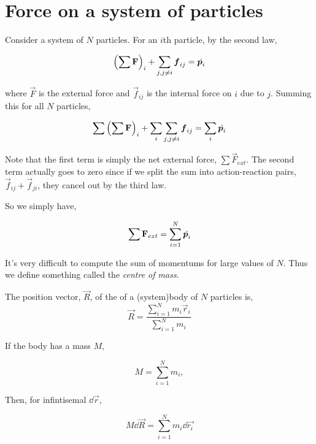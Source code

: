 \section{Force on a system of particles}

Consider a system of \(N\) particles. For an \(i\)th particle, by the second law,

\begin{equation*}
    \qty(\sum \mathbf{F})_i + \sum_{j, j \ne i} \boldsymbol{f}_{ij} = \dot{\boldsymbol{p}_i}
\end{equation*}

where \(\Vec{F}\) is the external force and \(\vec{f}_{ij}\) is the internal force
on \(i\) due to \(j\). Summing this for all \(N\) particles, 

\begin{equation*}
    \sum\qty(\sum \mathbf{F})_i + \sum_{i}\sum_{j, j \ne i} \boldsymbol{f}_{ij} = \sum_i\dot{\boldsymbol{p}_i}
\end{equation*}

Note that the first term is simply the net external force, \(\sum\Vec{F}_{ext}\). The second 
term actually goes to zero since if we split the sum into action-reaction pairs,
\(\vec{f}_{ij} + \vec{f}_{ji}\), they cancel out by the third law. 

So we simply have, 

\begin{equation*}
    \sum \mathbf{F}_{ext} = \sum_{i=1}^N\dot{\boldsymbol{p}_i}
\end{equation*}

It's very difficult to compute the sum of momentums for large values of \(N\). Thus
we define something called the \emph{centre of mass}.

\begin{definition}
    The position vector, \(\Vec{R}\), of the  of a (system)body of \(N\) particles is,
    \begin{equation}
        \Vec{R} = \frac{\sum_{i=1}^N m_i\vec{r}_i}{\sum_{i=1}^N m_i}
    \end{equation} 
\end{definition}

If the body has a mass \(M\), 

\[M = \sum_{i=1}^N m_i,\]

Then, for infintisemal \(\dd{\vec{r}}\), 

\begin{equation*}
    M\dd{\vec{R}} = \sum_{i=1}^N m_i\dd{\vec{r_i}}
\end{equation*}


